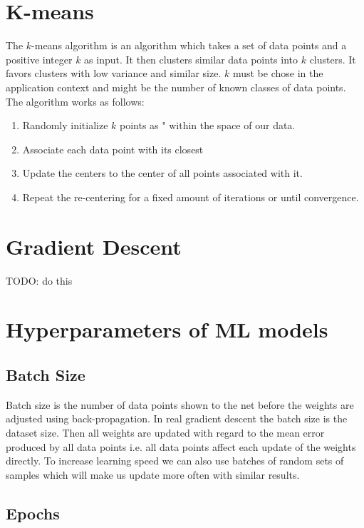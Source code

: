 \section{K-means}

The $k$-means algorithm is an algorithm which takes a set of data points and a positive integer $k$ as input. It then clusters similar data points into $k$ clusters. It favors clusters with low variance and similar size. $k$ must be chose in the application context and might be the number of known classes of data points.\\

The algorithm works as follows:
\begin{enumerate}
    \item Randomly initialize $k$ points as " within the space of our data.
    \item Associate each data point with its closest 
    \item Update the centers to the center of all points associated with it.
    \item Repeat the re-centering for a fixed amount of iterations or until convergence.
\end{enumerate}

\section{Gradient Descent}

TODO: do this

\section{Hyperparameters of ML models}

\subsection{Batch Size}

Batch size is the number of data points shown to the net before the weights are adjusted using back-propagation. In real gradient descent the batch size is the dataset size. Then all weights are updated with regard to the mean error produced by all data points i.e. all data points affect each update of the weights directly. To increase learning speed we can also use batches of random sets of samples which will make us update more often with similar results.

\subsection{Epochs}

